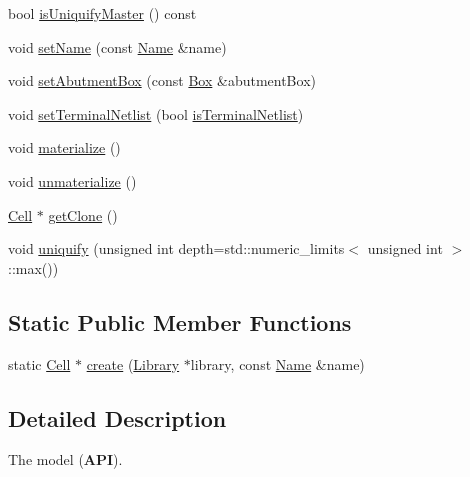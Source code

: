 \begin{DoxyCompactItemize}
\item 
bool \mbox{\hyperlink{classHurricane_1_1Cell_a0220dbbbe730e6874f7620135e9c10f6}{is\+Uniquify\+Master}} () const
\item 
void \mbox{\hyperlink{classHurricane_1_1Cell_ad2c9face922062664110c66ee205eab2}{set\+Name}} (const \mbox{\hyperlink{classHurricane_1_1Name}{Name}} \&name)
\item 
void \mbox{\hyperlink{classHurricane_1_1Cell_ab1949e2b708f0bd2d215ab90cfe864e0}{set\+Abutment\+Box}} (const \mbox{\hyperlink{classHurricane_1_1Box}{Box}} \&abutment\+Box)
\item 
void \mbox{\hyperlink{classHurricane_1_1Cell_a15958b25e911e8f5543557b6deea5618}{set\+Terminal\+Netlist}} (bool \mbox{\hyperlink{classHurricane_1_1Cell_a6fe2b5a80d4b344733416b25ea559497}{is\+Terminal\+Netlist}})
\item 
void \mbox{\hyperlink{classHurricane_1_1Cell_affefc597317063857f4904d4b16d5d4f}{materialize}} ()
\item 
void \mbox{\hyperlink{classHurricane_1_1Cell_a40c9ba4e3fc76b0c4bc58af8dcaddf53}{unmaterialize}} ()
\item 
\mbox{\hyperlink{classHurricane_1_1Cell}{Cell}} $\ast$ \mbox{\hyperlink{classHurricane_1_1Cell_a092f53c7f517ecc70d9ba375296c5d5b}{get\+Clone}} ()
\item 
void \mbox{\hyperlink{classHurricane_1_1Cell_aa113c121813342b6304f3e7fddbc8565}{uniquify}} (unsigned int depth=std\+::numeric\+\_\+limits$<$ unsigned int $>$\+::max())
\end{DoxyCompactItemize}
\subsection*{Static Public Member Functions}
\begin{DoxyCompactItemize}
\item 
static \mbox{\hyperlink{classHurricane_1_1Cell}{Cell}} $\ast$ \mbox{\hyperlink{classHurricane_1_1Cell_ad803afb3e52bea3bf3d520e353b162e0}{create}} (\mbox{\hyperlink{classHurricane_1_1Library}{Library}} $\ast$library, const \mbox{\hyperlink{classHurricane_1_1Name}{Name}} \&name)
\end{DoxyCompactItemize}


\subsection{Detailed Description}
The model ({\bfseries A\+PI}). 

